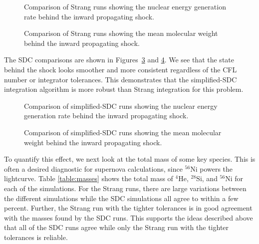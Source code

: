 \documentclass[linenumbers,trackchanges]{aastex631}
\newcommand{\isot}[2]{$^{#2}\mathrm{#1}$}
\begin{document}
\begin{figure}
\caption{\label{fig:strang_enuc_summary} Comparison of Strang runs showing
the nuclear energy generation rate behind the inward propagating
shock.}
\end{figure}

\begin{figure}
\caption{\label{fig:strang_abar_summary} Comparison of Strang runs showing
the mean molecular weight behind the inward propagating
shock.}
\end{figure}

The SDC comparisons are shown in Figures~\ref{fig:sdc_enuc_summary}
and \ref{fig:sdc_abar_summary}.  We see that the state behind the
shock looks smoother and more consistent regardless of the CFL number or integrator tolerances.
This demonstrates that the simplified-SDC integration algorithm is more
robust than Strang integration for this problem.

\begin{figure}
\caption{\label{fig:sdc_enuc_summary} Comparison of simplified-SDC runs showing
the nuclear energy generation rate behind the inward propagating
shock.}
\end{figure}

\begin{figure}
\caption{\label{fig:sdc_abar_summary} Comparison of simplified-SDC runs showing
the mean molecular weight behind the inward propagating
shock.}
\end{figure}


To quantify this effect, we next look at the total mass of some key
species.  This is often a desired diagnostic for supernova
calculations, since \isot{Ni}{56} powers the lightcurve.  Table
\ref{table:masses} shows the total mass of \isot{He}{4},
\isot{Si}{28}, and \isot{Ni}{56} for each of the simulations.  For the
Strang runs, there are large variations between the different
simulations while the SDC simulations all agree to within a few
percent.  Further, the Strang run with the tighter tolerances is in
good agreement with the masses found by the SDC runs.  This supports
the ideas described above that all of the SDC runs agree while only
the Strang run with the tighter tolerances is reliable.
\end{document}
